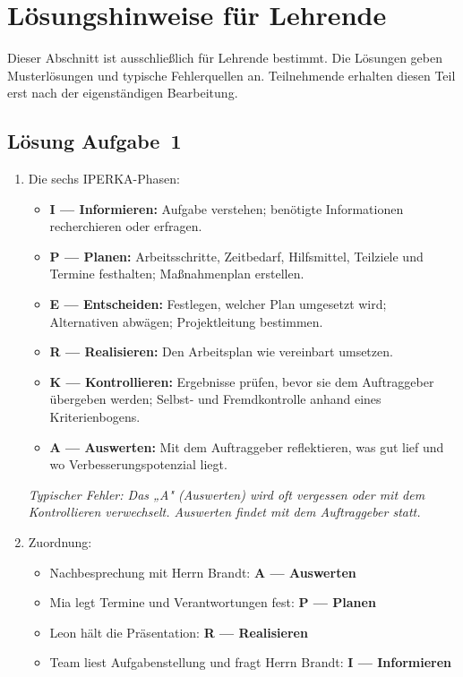 \documentclass[11pt, a4paper]{article}
\begin{document}
\newpage
\section*{Lösungshinweise für Lehrende}
\label{loesungen}

\begin{merksatz}[title={\bfseries Hinweis zur Nutzung}]
Dieser Abschnitt ist ausschließlich für Lehrende bestimmt. Die Lösungen geben
Musterlösungen und typische Fehlerquellen an. Teilnehmende erhalten diesen Teil
erst nach der eigenständigen Bearbeitung.
\end{merksatz}

\subsection*{Lösung Aufgabe~1}

\begin{enumerate}[label=(\alph*)]
  \item Die sechs IPERKA-Phasen:
  \begin{itemize}
    \item \textbf{I --- Informieren:} Aufgabe verstehen; benötigte Informationen recherchieren oder erfragen.
    \item \textbf{P --- Planen:} Arbeitsschritte, Zeitbedarf, Hilfsmittel, Teilziele und Termine festhalten; Maßnahmenplan erstellen.
    \item \textbf{E --- Entscheiden:} Festlegen, welcher Plan umgesetzt wird; Alternativen abwägen; Projektleitung bestimmen.
    \item \textbf{R --- Realisieren:} Den Arbeitsplan wie vereinbart umsetzen.
    \item \textbf{K --- Kontrollieren:} Ergebnisse prüfen, bevor sie dem Auftraggeber übergeben werden; Selbst- und Fremdkontrolle anhand eines Kriterienbogens.
    \item \textbf{A --- Auswerten:} Mit dem Auftraggeber reflektieren, was gut lief und wo Verbesserungspotenzial liegt.
  \end{itemize}

  \textit{Typischer Fehler: Das „A" (Auswerten) wird oft vergessen oder mit dem Kontrollieren verwechselt. Auswerten findet \emph{mit dem Auftraggeber} statt.}

  \item Zuordnung:
  \begin{itemize}
    \item Nachbesprechung mit Herrn Brandt: \textbf{A --- Auswerten}
    \item Mia legt Termine und Verantwortungen fest: \textbf{P --- Planen}
    \item Leon hält die Präsentation: \textbf{R --- Realisieren}
    \item Team liest Aufgabenstellung und fragt Herrn Brandt: \textbf{I --- Informieren}
  \end{itemize}
\end{enumerate}
\end{document}
